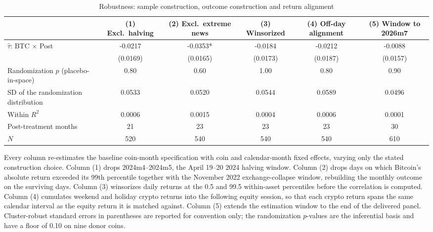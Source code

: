 \begin{table}[t]
\centering
\begin{threeparttable}
\caption{Robustness: sample construction, outcome construction and return alignment}
\label{tab:robustness_sample}
\begin{tabular}{lccccc}
\toprule
 & (1) Excl.\ halving & (2) Excl.\ extreme news & (3) Winsorized & (4) Off-day alignment & (5) Window to 2026m7 \\
\midrule
$\hat\tau$: BTC $\times$ Post & -0.0217 & -0.0353* & -0.0184 & -0.0212 & -0.0088 \\
 & (0.0169) & (0.0165) & (0.0173) & (0.0187) & (0.0157) \\
Randomization $p$ (placebo-in-space) & 0.80 & 0.60 & 1.00 & 0.80 & 0.90 \\
SD of the randomization distribution & 0.0533 & 0.0520 & 0.0544 & 0.0589 & 0.0496 \\
Within $R^2$ & 0.0006 & 0.0015 & 0.0004 & 0.0006 & 0.0001 \\
Post-treatment months & 21 & 23 & 23 & 23 & 30 \\
$N$ & 520 & 540 & 540 & 540 & 610 \\
\bottomrule
\end{tabular}
\begin{tablenotes}[flushleft]
\footnotesize
\item Every column re-estimates the baseline coin-month specification with coin and calendar-month fixed effects, varying only the stated construction choice. Column (1) drops 2024m4--2024m5, the April 19--20 2024 halving window. Column (2) drops days on which Bitcoin's absolute return exceeded its 99th percentile together with the November 2022 exchange-collapse window, rebuilding the monthly outcome on the surviving days. Column (3) winsorizes daily returns at the 0.5 and 99.5 within-asset percentiles before the correlation is computed. Column (4) cumulates weekend and holiday crypto returns into the following equity session, so that each crypto return spans the same calendar interval as the equity return it is matched against. Column (5) extends the estimation window to the end of the delivered panel. Cluster-robust standard errors in parentheses are reported for convention only; the randomization $p$-values are the inferential basis and have a floor of 0.10 on nine donor coins.
\end{tablenotes}
\end{threeparttable}
\end{table}
